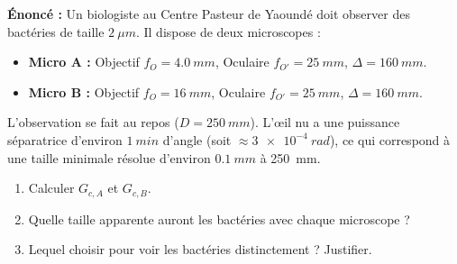 \documentclass[11pt]{article}
\begin{document}
\begin{exoresolu}
\textbf{Énoncé :} Un biologiste au Centre Pasteur de Yaoundé doit observer des bactéries de taille $\SI{2}{\mu m}$. Il dispose de deux microscopes :
\begin{itemize}
    \item \textbf{Micro A :} Objectif $f_O = \SI{4,0}{mm}$, Oculaire $f_{O'} = \SI{25}{mm}$, $\Delta = \SI{160}{mm}$.
    \item \textbf{Micro B :} Objectif $f_O = \SI{16}{mm}$, Oculaire $f_{O'} = \SI{25}{mm}$, $\Delta = \SI{160}{mm}$.
\end{itemize}
L'observation se fait au repos ($D = \SI{250}{mm}$). L'œil nu a une puissance séparatrice d'environ $\SI{1}{min}$ d'angle (soit $\approx \SI{3e-4}{rad}$), ce qui correspond à une taille minimale résolue d'environ $\SI{0,1}{mm}$ à \SI{250}{mm}.
\begin{enumerate}
    \item Calculer $G_{c,A}$ et $G_{c,B}$.
    \item Quelle taille apparente auront les bactéries avec chaque microscope ?
    \item Lequel choisir pour voir les bactéries distinctement ? Justifier.
\end{enumerate}


\end{exoresolu}
\end{document}
